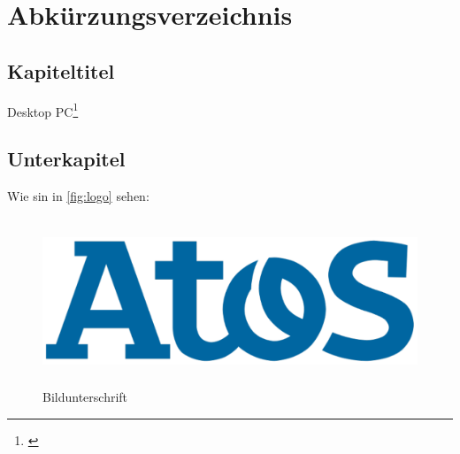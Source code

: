 \documentclass[
a4paper,   
titlepage,  
halfparskip,
12pt        
]{scrartcl}
\begin{document}

\newpage
\tableofcontents
\newpage
\section*{Abkürzungsverzeichnis} %
\begin{acronym}[Name]
\end{acronym}
\listoffigures
\listoftables
\setcounter{table}{0} %
\newpage
\begin{onehalfspacing} %
\pagestyle{fancy}
\fancyhf{} %
\fancyhead[L]{\leftmark} %
\fancyhead[R]{\thepage} %


\section{Kapiteltitel}
\label{sec:kap}
Desktop \acs{PC}\footnote{\cite[Crusher, W. (2014) S. 53]{quelle}}
\newpage
\subsection{Unterkapitel}
\label{subsec:kap}
Wie sin in \autoref{fig:logo} sehen: 
\begin{figure}[h]
  \centering
  \includegraphics[height=5.0cm]{logo}
  \caption[Beschreibung im Verzeichnis]{Bildunterschrift\footnotemark}
  \label{fig:logo}
\end{figure}
\newpage

\end{onehalfspacing}
\end{document}
